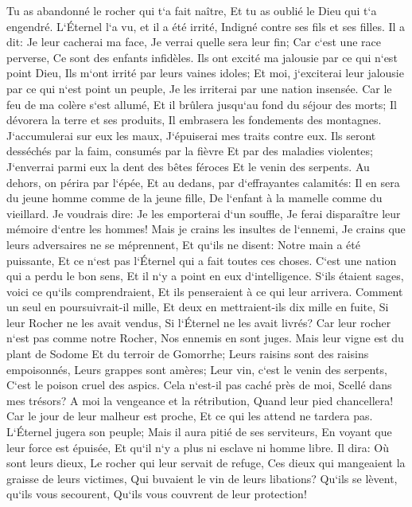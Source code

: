 \verse Tu as abandonné le rocher qui t`a fait naître, Et tu as oublié le Dieu qui t`a engendré. 
\verse L`Éternel l`a vu, et il a été irrité, Indigné contre ses fils et ses filles. 
\verse Il a dit: Je leur cacherai ma face, Je verrai quelle sera leur fin; Car c`est une race perverse, Ce sont des enfants infidèles. 
\verse Ils ont excité ma jalousie par ce qui n`est point Dieu, Ils m`ont irrité par leurs vaines idoles; Et moi, j`exciterai leur jalousie par ce qui n`est point un peuple, Je les irriterai par une nation insensée. 
\verse Car le feu de ma colère s`est allumé, Et il brûlera jusqu`au fond du séjour des morts; Il dévorera la terre et ses produits, Il embrasera les fondements des montagnes. 
\verse J`accumulerai sur eux les maux, J`épuiserai mes traits contre eux. 
\verse Ils seront desséchés par la faim, consumés par la fièvre Et par des maladies violentes; J`enverrai parmi eux la dent des bêtes féroces Et le venin des serpents. 
\verse Au dehors, on périra par l`épée, Et au dedans, par d`effrayantes calamités: Il en sera du jeune homme comme de la jeune fille, De l`enfant à la mamelle comme du vieillard. 
\verse Je voudrais dire: Je les emporterai d`un souffle, Je ferai disparaître leur mémoire d`entre les hommes! 
\verse Mais je crains les insultes de l`ennemi, Je crains que leurs adversaires ne se méprennent, Et qu`ils ne disent: Notre main a été puissante, Et ce n`est pas l`Éternel qui a fait toutes ces choses. 
\verse C`est une nation qui a perdu le bon sens, Et il n`y a point en eux d`intelligence. 
\verse S`ils étaient sages, voici ce qu`ils comprendraient, Et ils penseraient à ce qui leur arrivera. 
\verse Comment un seul en poursuivrait-il mille, Et deux en mettraient-ils dix mille en fuite, Si leur Rocher ne les avait vendus, Si l`Éternel ne les avait livrés? 
\verse Car leur rocher n`est pas comme notre Rocher, Nos ennemis en sont juges. 
\verse Mais leur vigne est du plant de Sodome Et du terroir de Gomorrhe; Leurs raisins sont des raisins empoisonnés, Leurs grappes sont amères; 
\verse Leur vin, c`est le venin des serpents, C`est le poison cruel des aspics. 
\verse Cela n`est-il pas caché près de moi, Scellé dans mes trésors? 
\verse A moi la vengeance et la rétribution, Quand leur pied chancellera! Car le jour de leur malheur est proche, Et ce qui les attend ne tardera pas. 
\verse L`Éternel jugera son peuple; Mais il aura pitié de ses serviteurs, En voyant que leur force est épuisée, Et qu`il n`y a plus ni esclave ni homme libre. 
\verse Il dira: Où sont leurs dieux, Le rocher qui leur servait de refuge, 
\verse Ces dieux qui mangeaient la graisse de leurs victimes, Qui buvaient le vin de leurs libations? Qu`ils se lèvent, qu`ils vous secourent, Qu`ils vous couvrent de leur protection! 
